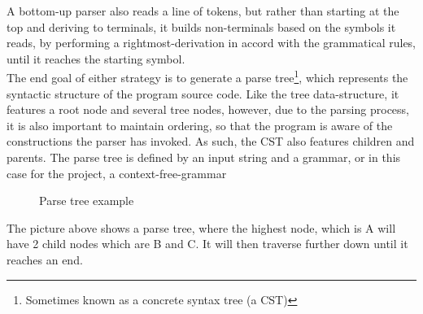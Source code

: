 A bottom-up parser also reads a line of tokens, but rather than starting at the top and deriving to terminals, it builds non-terminals based on the symbols it reads, by performing a rightmost-derivation in accord with the grammatical rules, until it reaches the starting symbol\cite{conceptsOfProgrammingLanguages}.\\

The end goal of either strategy is to generate a parse tree\footnote{Sometimes known as a concrete syntax tree (a CST)}, which represents the syntactic structure of the program source code. Like the tree data-structure, it features a root node and several tree nodes, however, due to the parsing process, it is also important to maintain ordering, so that the program is aware of the constructions the parser has invoked. As such, the CST also features children and parents. The parse tree is defined by an input string and a grammar, or in this case for the project, a context-free-grammar \\
\begin{figure}[H]
\centering
{}
\caption{Parse tree example}
\label{exampleparse}
\end{figure}

The picture above shows a parse tree, where the highest node, which is A will have 2 child nodes which are B and C. It will then traverse further down until it reaches an end.


